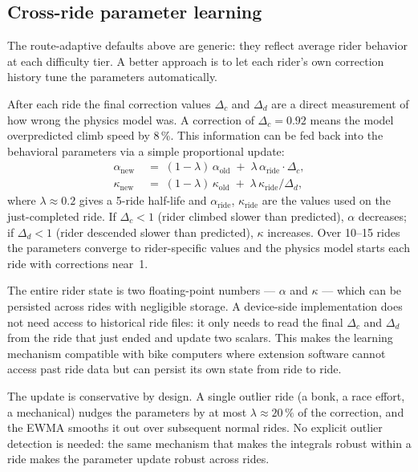 \documentclass[11pt,a4paper]{article}
\begin{document}
\subsection{Cross-ride parameter learning}
\label{sec:cross-ride}

The route-adaptive defaults above are generic: they reflect average
rider behavior at each difficulty tier. A better approach is to let
each rider's own correction history tune the parameters
automatically.

After each ride the final correction values $\Delta_c$ and $\Delta_d$
are a direct measurement of how wrong the physics model was. A
correction of $\Delta_c = 0.92$ means the model overpredicted climb
speed by 8\,\%. This information can be fed back into the behavioral
parameters via a simple proportional update:
\begin{align}
\label{eq:alpha-update}
\alpha_{\text{new}} &\;=\; (1 - \lambda)\,\alpha_{\text{old}}
  \;+\; \lambda\,\alpha_{\text{ride}} \cdot \Delta_c, \\
\kappa_{\text{new}} &\;=\; (1 - \lambda)\,\kappa_{\text{old}}
  \;+\; \lambda\,\kappa_{\text{ride}} / \Delta_d,
\end{align}
where $\lambda \approx 0.2$ gives a 5-ride half-life and
$\alpha_{\text{ride}}$, $\kappa_{\text{ride}}$ are the values used on
the just-completed ride. If $\Delta_c < 1$ (rider climbed slower than
predicted), $\alpha$ decreases; if $\Delta_d < 1$ (rider descended
slower than predicted), $\kappa$ increases. Over 10--15 rides the
parameters converge to rider-specific values and the physics model
starts each ride with corrections near~1.

The entire rider state is two floating-point numbers --- $\alpha$ and
$\kappa$ --- which can be persisted across rides with negligible
storage. A device-side implementation does not need access to
historical ride files: it only needs to read the final $\Delta_c$ and
$\Delta_d$ from the ride that just ended and update two scalars. This
makes the learning mechanism compatible with bike computers where
extension software cannot access past ride data but can persist its
own state from ride to ride.

The update is conservative by design. A single outlier ride (a bonk,
a race effort, a mechanical) nudges the parameters by at most
$\lambda \approx 20\,\%$ of the correction, and the EWMA smooths it
out over subsequent normal rides. No explicit outlier detection is
needed: the same mechanism that makes the integrals robust
within a ride makes the parameter update robust across rides.
\end{document}
